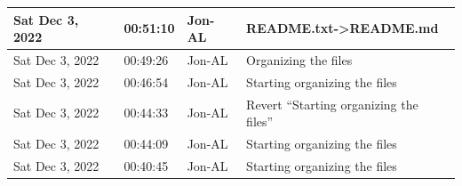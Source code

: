 \documentclass[11pt]{article}
\begin{document}
\begin{center}
\begin{longtable}{|p{2.7cm}|l|p{2cm}|p{8cm}|}
           \hline Sat Dec 3, 2022                            & 00:51:10                           & Jon-AL                                  & README.txt->README.md                                                                                                                                                                                                                                                                                      \\
           \hline Sat Dec 3, 2022                            & 00:49:26                           & Jon-AL                                  & Organizing the files                                                                                                                                                                                                                                                                                       \\
           \hline Sat Dec 3, 2022                            & 00:46:54                           & Jon-AL                                  & Starting organizing the files                                                                                                                                                                                                                                                                              \\
           \hline Sat Dec 3, 2022                            & 00:44:33                           & Jon-AL                                  & Revert ``Starting organizing the files''                                                                                                                                                                                                                                                                     \\
           \hline Sat Dec 3, 2022                            & 00:44:09                           & Jon-AL                                  & Starting organizing the files                                                                                                                                                                                                                                                                              \\
           \hline Sat Dec 3, 2022                            & 00:40:45                           & Jon-AL                                  & Starting organizing the files                                                                                                                                                                                                                                                                              \\

\end{longtable}
\end{center}
\end{document}
